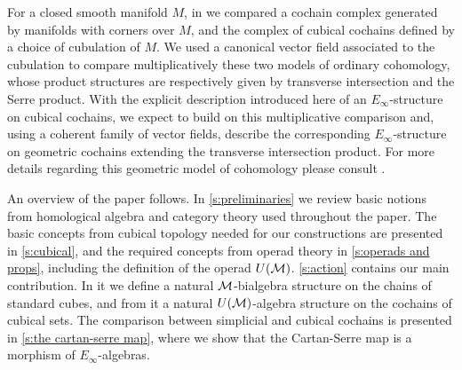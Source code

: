 For a closed smooth manifold $M$, in \cite{medina2021flowing} we compared a cochain complex generated by manifolds with corners over $M$, and the complex of cubical cochains defined by a choice of cubulation of $M$.
We used a canonical vector field associated to the cubulation to compare multiplicatively these two models of ordinary cohomology, whose product structures are respectively given by transverse intersection and the Serre product.
With the explicit description introduced here of an $E_\infty$-structure on cubical cochains, we expect to build on this multiplicative comparison and, using a coherent family of vector fields, describe the corresponding $E_\infty$-structure on geometric cochains extending the transverse intersection product.
For more details regarding this geometric model of cohomology please consult \cite{medina2021foundations}.

An overview of the paper follows.
In \cref{s:preliminaries} we review basic notions from homological algebra and category theory used throughout the paper.
The basic concepts from cubical topology needed for our constructions are presented in \cref{s:cubical}, and the required concepts from operad theory in \cref{s:operads and props}, including the definition of the operad $U(\mathcal{M})$.
\cref{s:action} contains our main contribution.
In it we define a natural $\mathcal{M}$-bialgebra structure on the chains of standard cubes, and from it a natural $U(\mathcal{M})$-algebra structure on the cochains of cubical sets.
The comparison between simplicial and cubical cochains is presented in \cref{s:the cartan-serre map}, where we show that the Cartan-Serre map is a morphism of $E_\infty$-algebras.